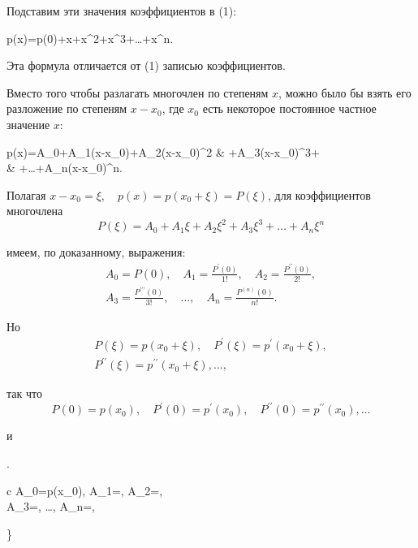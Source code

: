 \documentclass{book}
\begin{document}
Подставим эти значения коэффициентов в (1):
\begin{boldequation}
	p(x)=p(0)+x+x^{2}+x^{3}+\ldots+x^{n}.
\end{boldequation}

\noindent Эта формула отличается от (1) записью коэффициентов.

Вместо того чтобы разлагать многочлен по степеням $x$, можно было бы взять его разложение по степеням $x-x_{0}$, где $x_{0}$ есть некоторое постоянное частное значение $x$:
\begin{boldequation}
	\begin{aligned}
		p(x)=A_{0}+A_{1}\left(x-x_{0}\right)+A_{2}\left(x-x_{0}\right)^{2} & +A_{3}\left(x-x_{0}\right)^{3}+        \\
		                                                                   & +\ldots+A_{n}\left(x-x_{0}\right)^{n}.
	\end{aligned}
\end{boldequation}

\noindent Полагая $x-x_{0}=\xi, \quad p(x)=p\left(x_{0}+\xi\right)=P(\xi)$, для коэффициентов многочлена
$$
	P(\xi)=A_{0}+A_{1}\xi+A_{2}\xi^{2}+A_{3}\xi^{3}+\ldots+A_{n}\xi^{n}
$$

\noindent имеем, по доказанному, выражения:
$$
	\begin{gathered}
		A_{0}=P(0), \quad A_{1}=\frac{P^{\prime}(0)}{1!}, \quad A_{2}=\frac{P^{\prime \prime}(0)}{2!}, \\
		A_{3}=\frac{P^{\prime \prime \prime}(0)}{3!}, \quad \ldots, \quad A_{n}=\frac{P^{(n)}(0)}{n!}.
	\end{gathered}
$$

\noindent Но
$$
	\begin{gathered}
		P(\xi)=p\left(x_{0}+\xi\right), \quad P^{\prime}(\xi)=p^{\prime}\left(x_{0}+\xi\right), \\
		P^{\prime \prime}(\xi)=p^{\prime \prime}\left(x_{0}+\xi\right), \ldots,
	\end{gathered}
$$

\noindent так что
$$
	P(0)=p\left(x_{0}\right), \quad P^{\prime}(0)=p^{\prime}\left(x_{0}\right), \quad P^{\prime \prime}(0)=p^{\prime \prime}\left(x_{0}\right), \ldots
$$

\noindent и
\begin{boldequation}
	\left.\begin{array}{c}
		A_{0}=p\left(x_{0}\right), \quad A_{1}=, \quad A_{2}=, \\
		A_{3}=, \ldots, A_{n}=,
	\end{array}\right\}
\end{boldequation}

\noindent {}
\end{document}
